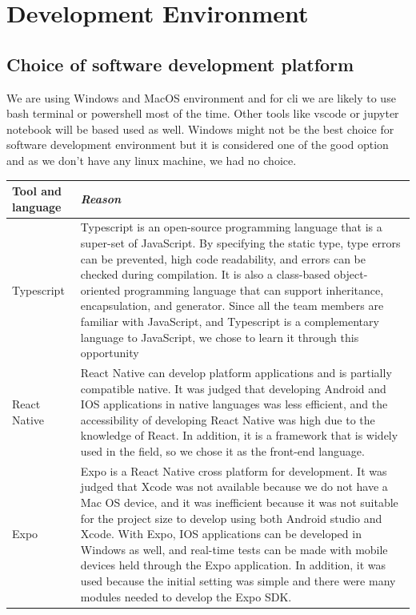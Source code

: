 \documentclass[conference]{IEEEtran}
\begin{document}
\newpage

\section{Development Environment}
\subsection{Choice of software development platform}
We are using Windows and MacOS environment and for cli we are likely to use bash terminal or powershell most of the time. Other tools like vscode or jupyter notebook will be based used as well. Windows might not be the best choice for software development environment but it is considered one of the good option and as we don't have any linux machine, we had no choice.

\begin{table}[!htbp]\normalsize
\begin{center}
\begin{tabular}{|p{1.4cm}|p{6.2cm}|}
\hline
\textbf{Tool and language} & \textbf{\textit{Reason}}\\
\hline
Typescript & Typescript is an open-source programming language that is a super-set of JavaScript. By specifying the static type, type errors can be prevented, high code readability, and errors can be checked during compilation. It is also a class-based object-oriented programming language that can support inheritance, encapsulation, and generator. Since all the team members are familiar with JavaScript, and Typescript is a complementary language to JavaScript, we chose to learn it through this opportunity 
\\ \hline
React Native & React Native can develop platform applications and is partially compatible native. It was judged that developing Android and IOS applications in native languages was less efficient, and the accessibility of developing React Native was high due to the knowledge of React. In addition, it is a framework that is widely used in the field, so we chose it as the front-end language.
\\ \hline
Expo & Expo is a React Native cross platform for development. It was judged that Xcode was not available because we do not have a Mac OS device, and it was inefficient because it was not suitable for the project size to develop using both Android studio and Xcode. With Expo, IOS applications can be developed in Windows as well, and real-time tests can be made with mobile devices held through the Expo application. In addition, it was used because the initial setting was simple and there were many modules needed to develop the Expo SDK.
\\ \hline
\end{tabular}
\label{tab1}
\end{center}
\end{table}
\newpage
\end{document}
